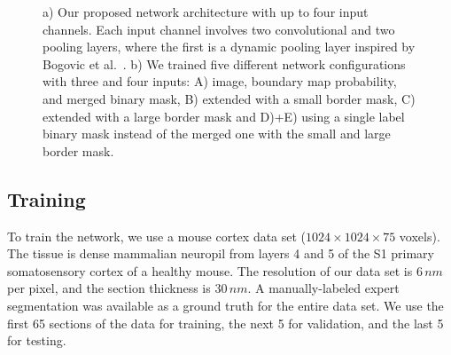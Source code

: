 \begin{figure}[t]
 \centering
    \hfill
	\caption{ a) Our proposed network architecture with up to four input channels. Each input channel involves two convolutional and two pooling layers, where the first is a dynamic pooling layer inspired by Bogovic et al.~\cite{BogovicHJ13}. b) We trained five different network configurations with three and four inputs: A) image, boundary map probability, and merged binary mask, B) extended with a small border mask, C) extended with a large border mask and D)+E) using a single label binary mask instead of the merged one with the small and large border mask.}
\end{figure}
%  


\subsection{Training}
To train the network, we use a mouse cortex data set ($1024\times1024\times75$ voxels). The tissue is dense mammalian neuropil from layers 4 and 5 of the S1 primary somatosensory cortex of a healthy mouse. The resolution of our data set is $6\, nm$ per pixel, and the section thickness is $30\, nm$. 
A manually-labeled expert segmentation was available as a ground truth for the entire data set. We use the first 65 sections of the data for training, the next 5 for validation, and the last 5 for testing.
%

